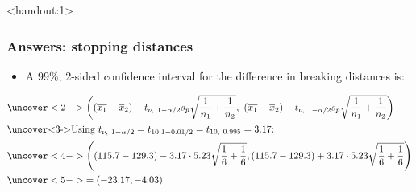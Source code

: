 \documentclass[handout]{beamer}\usepackage[]{graphicx}\usepackage[]{color}
\newcommand{\answers}{1}
\providecommand{\ov}[1]{\overline{#1}}
\numberwithin{equation}{section}
\begin{document}
\begin{frame}<handout:\answers>
\frametitle{Answers: stopping distances} \scriptsize
\begin{itemize}
\item A 99\%, 2-sided confidence interval for the difference in breaking distances is:
\end{itemize}
\begin{align*}
&\uncover<2->{\left ((\ov{x_1} - \ov{x}_2) - t_{\nu, \ 1 - \alpha/2} s_p \sqrt{\frac{1}{n_1} + \frac{1}{n_2}} , \ (\ov{x_1} - \ov{x}_2) + t_{\nu, \ 1 - \alpha/2} s_p \sqrt{\frac{1}{n_1} + \frac{1}{n_2}} \right )} \\
\intertext{\uncover<3->{Using $t_{\nu, \ 1 - \alpha/2} = t_{10, 1 - 0.01/2} = t_{10, \ 0.995} = 3.17$:}}
&\uncover<4->{\left ((115.7 - 129.3) - 3.17 \cdot 5.23 \sqrt{\frac{1}{6} + \frac{1}{6}} , (115.7 - 129.3) + 3.17 \cdot 5.23 \sqrt{\frac{1}{6} + \frac{1}{6}} \right )} \\
&\uncover<5->{=  (-23.17, -4.03)}
\end{align*}
\begin{itemize}
\end{itemize}
\end{frame}































\end{document}
